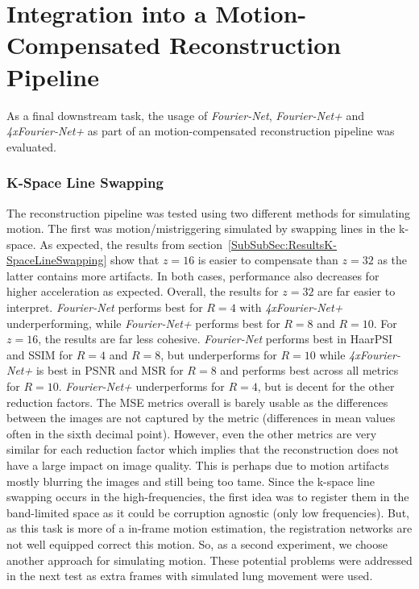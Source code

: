 \section{Integration into a Motion-Compensated Reconstruction Pipeline} \label{Sec:DiscussionIntegrationMotion-CompensatedReconstructionPipeline}
As a final downstream task, the usage of \emph{Fourier-Net}, \emph{Fourier-Net+} and \emph{4xFourier-Net+} as part of an motion-compensated reconstruction pipeline was evaluated.

\subsubsection{K-Space Line Swapping}
The reconstruction pipeline was tested using two different methods for simulating motion. The first was motion/mistriggering simulated by swapping lines in the k-space. As expected, the results from section~\ref{SubSubSec:ResultsK-SpaceLineSwapping} show that $z=16$ is easier to compensate than $z=32$ as the latter contains more artifacts. In both cases, performance also decreases for higher acceleration as expected. Overall, the results for $z=32$ are far easier to interpret. \emph{Fourier-Net} performs best for $R=4$ with \emph{4xFourier-Net+} underperforming, while \emph{Fourier-Net+} performs best for $R=8$ and $R=10$. For $z=16$, the results are far less cohesive. \emph{Fourier-Net} performs best in HaarPSI and SSIM for $R=4$ and $R=8$, but underperforms for $R=10$ while \emph{4xFourier-Net+} is best in PSNR and MSR for $R=8$ and performs best across all metrics for $R=10$. \emph{Fourier-Net+} underperforms for $R=4$, but is decent for the other reduction factors. The MSE metrics overall is barely usable as the differences between the images are not captured by the metric (differences in mean values often in the sixth decimal point). However, even the other metrics are very similar for each reduction factor which implies that the reconstruction does not have a large impact on image quality. This is perhaps due to motion artifacts mostly blurring the images and still being too tame. Since the k-space line swapping occurs in the high-frequencies, the first idea was to register them in the band-limited space as it could be corruption agnostic (only low frequencies). But, as this task is more of a in-frame motion estimation, the registration networks are not well equipped correct this motion. So, as a second experiment, we choose another approach for simulating motion. These potential problems were addressed in the next test as extra frames with simulated lung movement were used.

